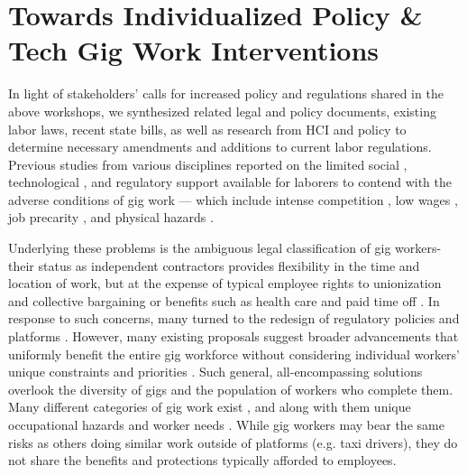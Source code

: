 \chapter{Towards Individualized Policy \& Tech Gig Work Interventions} \label{4individualized}
In light of stakeholders' calls for increased policy and regulations shared in the above workshops, we synthesized related legal and policy documents, existing labor laws, recent state bills, as well as research from HCI and policy to determine necessary amendments and additions to current labor regulations.
Previous studies from various disciplines reported on the limited social \cite{atom,Kuhn2019-fi,Wood2019-jp}, technological \cite{chiworkli,platform_manage}, and regulatory \cite{Dubal2019-qi,Hardy2022-xd,Graham2017-zw,Tan2021-li,regulating} support available for laborers to contend with the adverse conditions of gig work --- which include intense competition \cite{bates2021lessons,boundary}, low wages \cite{Friedman2014-cz,Kalleberg_undated-sb,good}, job precarity \cite{Ashford2018-dw,precarity}, and physical hazards \cite{Bajwa2018-gy,Howard2017-wd}. 

Underlying these problems is the ambiguous legal classification of gig workers-their status as independent contractors provides flexibility in the time and location of work, but at the expense of typical employee rights to unionization and collective bargaining or benefits such as health care and paid time off \cite{category}. In response to such concerns, many turned to the redesign of regulatory policies \cite{regulate, regulating} and platforms \cite{arnoldi2021mapping,Jabagi2019-dt}. However, many existing proposals suggest broader advancements that uniformly benefit the entire gig workforce without considering individual workers' unique constraints and priorities \cite{codesign}. Such general, all-encompassing solutions overlook the diversity of gigs and the population of workers who complete them. Many different categories of gig work exist \cite{Duggan2020-qh}, and along with them unique occupational hazards and worker needs  \cite{Bajwa2018-gy}. While gig workers may bear the same risks as others doing similar work outside of platforms (e.g. taxi drivers), they do not share the benefits and protections typically afforded to employees. 

